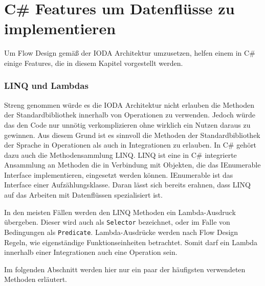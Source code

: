 \section{C\# Features um Datenflüsse zu implementieren}

Um Flow Design gemäß der IODA Architektur umzusetzen, helfen einem in C\# einige Features, die in diesem Kapitel vorgestellt werden.

\subsubsection{LINQ und Lambdas}

Streng genommen würde es die IODA Architektur nicht erlauben die Methoden der
Standardbibliothek innerhalb von Operationen zu verwenden. Jedoch würde das den
Code nur unnötig verkomplizieren ohne wirklich ein Nutzen daraus zu gewinnen.
Aus diesem Grund ist es sinnvoll die Methoden der Standardbibliothek der Sprache
in Operationen als auch in Integrationen zu erlauben.
In C\# gehört dazu auch die Methodensammlung LINQ. 
LINQ ist eine in C\# integrierte Ansammlung an Methoden die in Verbindung mit
Objekten, die das IEnumerable Interface implementieren, eingesetzt werden
können.
IEnumerable ist das Interface einer Aufzählungsklasse. Daran lässt sich bereits erahnen, dass LINQ
auf das Arbeiten mit Datenflüssen spezialisiert ist.

In den meisten Fällen werden den LINQ Methoden ein Lambda-Ausdruck übergeben.
Dieser wird auch als \texttt{Selector} bezeichnet, oder im Falle von Bedingungen als \texttt{Predicate}.
Lambda-Ausdrücke werden nach Flow Design Regeln, wie eigenständige
Funktionseinheiten betrachtet. Somit darf ein Lambda innerhalb einer 
Integrationen auch eine Operation sein.




\bigskip
Im folgenden Abschnitt werden hier nur ein paar der häufigsten verwendeten Methoden erläutert.

